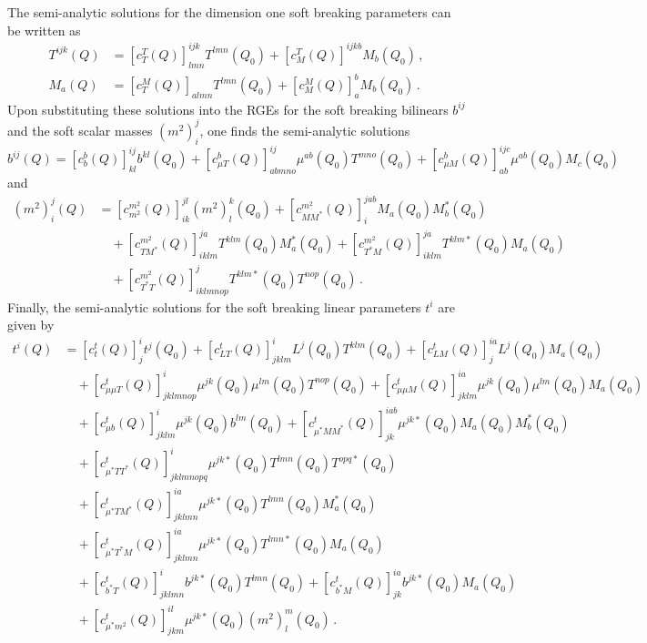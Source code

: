 \documentclass[final,3p,11pt,pdflatex]{elsarticle}
\newcommand{\scoeff}[2]{[ c^{#1}_{#2}(Q) ]}
\begin{document}
The semi-analytic solutions for the dimension one soft breaking parameters can
be written as
\begin{align}
  T^{ijk}(Q) &= \scoeff{T}{T}^{ijk}_{lmn} T^{lmn}(Q_0)
  + \scoeff{T}{M}^{ijkb} M_b(Q_0) \, ,
  \label{eq:general-soft-trilinear-solution} \\
  M_a(Q) &= \scoeff{M}{T}_{almn} T^{lmn}(Q_0)
  + \scoeff{M}{M}_a^b M_b(Q_0) \, .
  \label{eq:general-gaugino-mass-solution}
\end{align}
Upon substituting these solutions into the RGEs for the soft breaking bilinears
$b^{ij}$ and the soft scalar masses $(m^2)_i^j$, one finds the semi-analytic
solutions
\begin{equation} \label{eq:general-soft-bilinear-solution}
  b^{ij}(Q) = \scoeff{b}{b}^{ij}_{kl} b^{kl}(Q_0)
  + \scoeff{b}{\mu T}^{ij}_{abmno} \mu^{ab}(Q_0) T^{mno}(Q_0)
  + \scoeff{b}{\mu M}^{ijc}_{ab} \mu^{ab}(Q_0) M_c(Q_0)
\end{equation}
and
\begin{align}
  (m^2)_i^j(Q) &= \scoeff{m^2}{m^2}^{jl}_{ik} (m^2)^k_l(Q_0)
  + \scoeff{m^2}{MM^*}_i^{jab} M_a(Q_0) M_b^*(Q_0) \nonumber \\
  & \quad {} + \scoeff{m^2}{T M^*}_{iklm}^{ja} T^{klm}(Q_0) M_a^*(Q_0)
  + \scoeff{m^2}{T^* M}_{iklm}^{ja} T^{klm*}(Q_0)
  M_a(Q_0) \nonumber \\
  & \quad {} + \scoeff{m^2}{T^* T}_{iklmnop}^j T^{klm*}(Q_0) T^{nop}(Q_0) \, .
  \label{eq:general-soft-scalar-mass-solution}
\end{align}
Finally, the semi-analytic solutions for the soft breaking linear parameters
$t^i$ are given by
\begin{align}
  t^i(Q) &= \scoeff{t}{t}^i_j t^j(Q_0) + \scoeff{t}{L T}^i_{jklm} L^j(Q_0)
  T^{klm}(Q_0) + \scoeff{t}{LM}^{ia}_j L^j(Q_0) M_a(Q_0) \nonumber \\
  & \quad {} + \scoeff{t}{\mu \mu T}^i_{jklmnop} \mu^{jk}(Q_0) \mu^{lm}(Q_0)
  T^{nop}(Q_0) + \scoeff{t}{\mu \mu M}^{ia}_{jklm} \mu^{jk}(Q_0) \mu^{lm}(Q_0)
  M_a(Q_0)
  \nonumber \\
  & \quad {} + \scoeff{t}{\mu b}^i_{jklm} \mu^{jk}(Q_0) b^{lm}(Q_0)
  + \scoeff{t}{\mu^* M M^*}^{iab}_{jk} \mu^{jk*}(Q_0) M_a(Q_0) M_b^*(Q_0)
  \nonumber \\
  & \quad {} + \scoeff{t}{\mu^* T T^*}^i_{jklmnopq} \mu^{jk*}(Q_0) T^{lmn}(Q_0)
  T^{opq*}(Q_0) \nonumber \\
  & \quad {} + \scoeff{t}{\mu^* T M^*}^{ia}_{jklmn} \mu^{jk*}(Q_0) T^{lmn}(Q_0)
  M_a^*(Q_0) \nonumber \\
  & \quad {} + \scoeff{t}{\mu^* T^* M}^{ia}_{jklmn} \mu^{jk*}(Q_0) T^{lmn*}(Q_0)
  M_a(Q_0) \nonumber \\
  & \quad {} + \scoeff{t}{b^* T}^i_{jklmn} b^{jk*}(Q_0) T^{lmn}(Q_0)
  + \scoeff{t}{b^* M}^{ia}_{jk} b^{jk*}(Q_0) M_a(Q_0) \nonumber \\
  & \quad {} + \scoeff{t}{\mu^* m^2}^{il}_{jkm} \mu^{jk*}(Q_0) (m^2)^m_l(Q_0)
  \, . \label{eq:general-soft-linear-solution}
\end{align}
\end{document}
